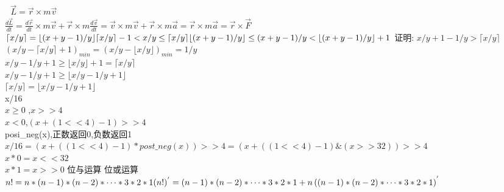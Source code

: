\documentclass{article}
\begin{document}
\begin{CJK}{UTF8}{gkai}
\end{CJK}
\begin{CJK}{UTF8}{gbsn}
\textcolor[rgb]{1,0,0}{\begin{math} \end{math} \begin{math}			\end{math}}
\begin{math}			
	\vec{L}=\vec{r}\times m \vec{v}
\end{math}\\[0.1cm]

\begin{math}
	\frac{d \vec{L}}{dt}
	=\frac{d \vec{r}}{dt}\times{}m \vec{v}+\vec{r}\times{}m \frac{d \vec{v}}{dt}
	=\vec{v}\times{}m \vec{v}+\vec{r}\times{}m \vec{a}
	=\vec{r}\times{}m \vec{a}
	=\vec{r}\times{}\vec{F}
\end{math}\\[0.1cm]
\begin{math}	
	\lceil x/y\rceil=\lfloor (x+y-1)/y\rfloor	\\
	\lceil x/y\rceil-1<x/y\le \lceil x/y\rceil	\\
	\lfloor (x+y-1)/y \rfloor\le (x+y-1)/y<\lfloor (x+y-1)/y \rfloor+1	\\
\end{math}
证明: $x/y+1-1/y>\lceil x/y\rceil$	\\
$\left( x/y-\lceil x/y\rceil+1 \right)_{min}=(x/y-\lfloor x/y\rfloor)_{min}=1/y$	\\
$x/y-1/y+1\ge\lfloor x/y\rfloor+1=\lceil x/y\rceil$	\\
$x/y-1/y+1\ge\lfloor x/y-1/y+1\rfloor$	\\
$\lceil x/y\rceil=\lfloor x/y-1/y+1\rfloor$	\\[3ex]
x/16	\\
$x\ge0$	,$x>>4$	\\
$x<0$,$(x+(1<<4)-1)>>4$	\\
posi\_neg(x),正数返回0,负数返回1	\\
$x/16=(x+((1<<4)-1)*post\_neg(x))>>4=(x+((1<<4)-1)\&(x>>32))>>4$	\\
$x*0=x<<32$	\\
$x*1=x>>0$
位与运算
位或运算	\\[3ex]
\begin{math}
	n!=n*(n-1)*(n-2)*\cdots*3*2*1	\\
	(n!)^{'}=(n-1)*(n-2)*\cdots*3*2*1+n\left( (n-1)*(n-2)*\cdots*3*2*1 \right )^{'}	\\

\end{math}
\end{CJK}
\end{document}
